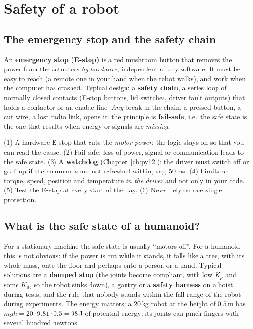 \section*{Safety of a robot}
\subsection*{The emergency stop and the safety chain}
An \textbf{emergency stop (E-stop)} is a red mushroom button that removes the power from the actuators \emph{by hardware}, independent of any software. It must be easy to reach (a remote one in your hand when the robot walks), and work when the computer has crashed. Typical design: a \textbf{safety chain}, a series loop of normally closed contacts (E-stop buttons, lid switches, driver fault outputs) that holds a contactor or an enable line. \emph{Any} break in the chain, a pressed button, a cut wire, a lost radio link, opens it: the principle is \textbf{fail-safe}, i.e.\ the safe state is the one that results when energy or signals are \emph{missing}.
\begin{keyidea}
(1) A hardware E-stop that cuts the \emph{motor power}; the logic stays on so that you can read the cause. (2) Fail-safe: loss of power, signal or communication leads to the safe state. (3) A \textbf{watchdog} (Chapter~\ref{ch:py12}): the driver must switch off or go limp if the commands are not refreshed within, say, $50$\,ms. (4) Limits on torque, speed, position and temperature \emph{in the driver} and not only in your code. (5) Test the E-stop at every start of the day. (6) Never rely on one single protection.
\end{keyidea}
\subsection*{What is the safe state of a humanoid?}
For a stationary machine the safe state is usually ``motors off''. For a humanoid this is not obvious: if the power is cut while it stands, it falls like a tree, with its whole mass, onto the floor and perhaps onto a person or a hand. Typical solutions are a \textbf{damped stop} (the joints become compliant, with low $K_p$ and some $K_d$, so the robot sinks down), a gantry or a \textbf{safety harness} on a hoist during tests, and the rule that nobody stands within the fall range of the robot during experiments. The energy matters: a $20$\,kg robot at the height of $0.5$\,m has $mgh=20\cdot9.81\cdot0.5=98$\,J of potential energy; its joints can pinch fingers with several hundred newtons.

